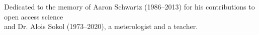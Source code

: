 \thispagestyle{empty}
\null
\vfill
\begin{center}
\noindent
Dedicated to the memory of Aaron Schwartz (1986--2013) for his contributions to
open access science\\and Dr. Alois Sokol (1973--2020), a meterologist and a
teacher.
\end{center}
\vfill
